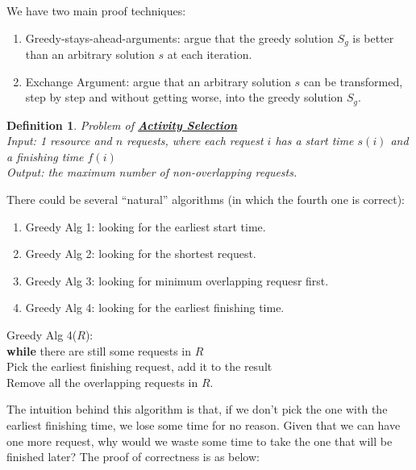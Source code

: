 \documentclass[twoside]{article}
\newcommand{\pc}[1]{\mbox{\textbf{#1}}} %
\newtheorem{protodefinition}[prototheorem]{Definition}
\newenvironment{definition}
{\colorlet{shadecolor}{cyan!15}\begin{shaded}\begin{protodefinition}\normalfont}
		{\end{protodefinition}\end{shaded}}
\begin{document}
We have two main proof techniques: 
\begin{enumerate}
	\item Greedy-stays-ahead-arguments: argue that the greedy solution $S_g$ is better than an arbitrary solution $s$ at each iteration. 
	\item Exchange Argument: argue that an arbitrary solution $s$ can be transformed, step by step and without getting worse, into the greedy solution $S_g$. 
\end{enumerate}
\begin{definition}
	Problem of \textbf{\underline{Activity Selection}}\\
	Input: 1 resource and $n$ requests, where each request $i$ has a start time $s(i)$ and a finishing time $f(i)$\\
	Output: the maximum number of non-overlapping requests. 
\end{definition}
There could be several ``natural'' algorithms (in which the fourth one is correct): 
\begin{enumerate}
	\item Greedy Alg 1: looking for the earliest start time. 
	\item Greedy Alg 2: looking for the shortest request. 
	\item Greedy Alg 3: looking for minimum overlapping requesr first. 
	\item Greedy Alg 4: looking for the earliest finishing time. 
\end{enumerate}
\begin{algorithme}
	Greedy Alg 4($R$): \\
	\>\pc{while} there are still some requests in $R$\\
	\>\>Pick the earliest finishing request, add it to the result\\
	\>\>Remove all the overlapping requests in $R$. 
\end{algorithme}
The intuition behind this algorithm is that, if we don't pick the one with the earliest finishing time, we lose some time for no reason. Given that we can have one more request, why would we waste some time to take the one that will be finished later? The proof of correctness is as below: 
\end{document}
